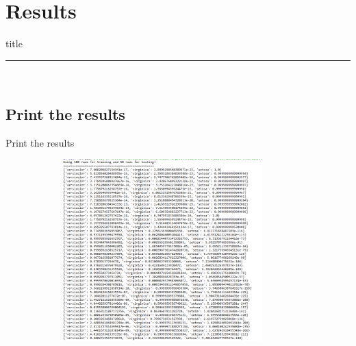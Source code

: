 \documentclass{beamer}
\begin{document}
\section{Results}
    \begin{frame}[plain]
        \vfill
      \centering
      \begin{beamercolorbox}[sep=8pt,center,shadow=true,rounded=true]{title}
        \insertsectionhead\par%
        \color{oxfordblue}\noindent\rule{10cm}{1pt} \\
        \LARGE{\faFileTextO}
      \end{beamercolorbox}
      \vfill
  \end{frame}

\subsection{Print the results}
    \begin{frame}{Print the results}
        \begin{center}
            \begin{figure}
                \begin{center}
                     \includegraphics[width = 10cm, height = 7cm]{Theme/images/results1.PNG}
                \end{center}
            \end{figure}
        \end{center}
    \end{frame}
\end{document}

